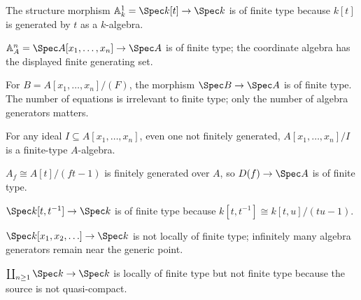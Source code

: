 \begin{example}\label{ex:vi26-r01}
The structure morphism $\mathbb A^1_k=\Spec k[t]\to\Spec k$ is of finite type because $k[t]$ is generated by $t$ as a $k$-algebra.
\end{example}

\begin{example}\label{ex:vi26-r02}
$\mathbb A^n_A=\Spec A[x_1,\dots,x_n]\to\Spec A$ is of finite type; the coordinate algebra has the displayed finite generating set.
\end{example}

\begin{example}\label{ex:vi26-r03}
For $B=A[x_1,\dots,x_n]/(F)$, the morphism $\Spec B\to\Spec A$ is of finite type.  The number of equations is irrelevant to finite type; only the number of algebra generators matters.
\end{example}

\begin{example}\label{ex:vi26-r04}
For any ideal $I\subseteq A[x_1,\dots,x_n]$, even one not finitely generated, $A[x_1,\dots,x_n]/I$ is a finite-type $A$-algebra.
\end{example}

\begin{example}\label{ex:vi26-r05}
$A_f\cong A[t]/(ft-1)$ is finitely generated over $A$, so $D(f)\to\Spec A$ is of finite type.
\end{example}

\begin{example}\label{ex:vi26-r06}
$\Spec k[t,t^{-1}]\to\Spec k$ is of finite type because $k[t,t^{-1}]\cong k[t,u]/(tu-1)$.
\end{example}

\begin{example}\label{ex:vi26-r07}
$\Spec k[x_1,x_2,\ldots]\to\Spec k$ is not locally of finite type; infinitely many algebra generators remain near the generic point.
\end{example}

\begin{example}\label{ex:vi26-r08}
$\coprod_{n\ge1}\Spec k\to\Spec k$ is locally of finite type but not finite type because the source is not quasi-compact.
\end{example}

